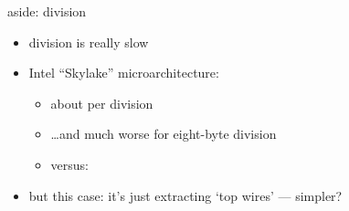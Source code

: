 \begin{frame}[fragile,label=onDivision]{aside: division}
\begin{itemize}
\item division is really slow
\item Intel ``Skylake'' microarchitecture:
    \begin{itemize}
    \item about  per division
    \item \ldots and much worse for eight-byte division
    \item versus: 
    \end{itemize}
\vspace{.5cm}
\item<2> but this case: it's just extracting `top wires' --- simpler?
\end{itemize}
\end{frame}
